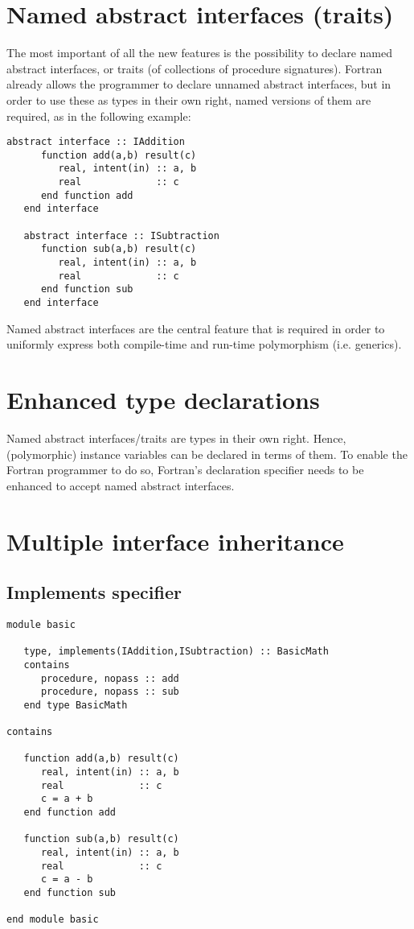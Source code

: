 \documentclass[11pt,oneside]{report}
\newcommand{\code}[1]{{\selectfont\ttfamily{#1}}}
\begin{document}
\section{Named abstract interfaces (traits)}

The most important of all the new features is the possibility to
declare named abstract interfaces, or traits (of collections of
procedure signatures). Fortran already allows the programmer to
declare unnamed abstract interfaces, but in order to use these as
types in their own right, named versions of them are required,
as in the following example:

\begin{lstlisting}[language=LFortran,style=boxed]
   abstract interface :: IAddition
      function add(a,b) result(c)
         real, intent(in) :: a, b
         real             :: c
      end function add
   end interface

   abstract interface :: ISubtraction
      function sub(a,b) result(c)
         real, intent(in) :: a, b
         real             :: c
      end function sub
   end interface
\end{lstlisting}
Named abstract interfaces are the central feature that is required in
order to uniformly express both compile-time and run-time polymorphism
(i.e. generics).

\section{Enhanced type declarations}

Named abstract interfaces/traits are types in their own right. Hence,
(polymorphic) instance variables can be declared in terms of them. To
enable the Fortran programmer to do so, Fortran's \code{type}
declaration specifier needs to be enhanced to accept named abstract
interfaces.


\section{Multiple interface inheritance}

\subsection{Implements specifier}

\begin{lstlisting}[language=LFortran,style=boxed]
module basic
  
   type, implements(IAddition,ISubtraction) :: BasicMath
   contains
      procedure, nopass :: add
      procedure, nopass :: sub
   end type BasicMath

contains

   function add(a,b) result(c)
      real, intent(in) :: a, b
      real             :: c
      c = a + b
   end function add

   function sub(a,b) result(c)
      real, intent(in) :: a, b
      real             :: c
      c = a - b
   end function sub
      
end module basic      
\end{lstlisting}
\end{document}
